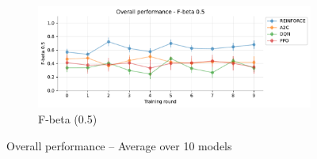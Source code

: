 \documentclass[a4paper, 12pt]{article}
\begin{document}
\begin{figure}[!htbp]
	\begin{subfigure}{\textwidth}
		\centering
		\includegraphics[width=\linewidth]{Overall_F05.pdf}  
		\caption{F-beta (0.5)}
		\label{fig:tr-ovr-f05}
	\end{subfigure}
	\caption{Overall performance -- Average over 10 models}
	\label{fig:tr-overall}
\end{figure}
\end{document}
